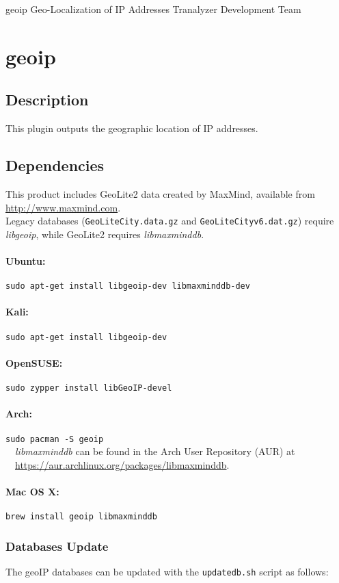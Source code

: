 \documentclass[documentation]{subfiles}
\begin{document}
\trantitle
    {geoip}
    {Geo-Localization of IP Addresses}
    {Tranalyzer Development Team}

\section{geoip}\label{s:geoip}

\subsection{Description}
This plugin outputs the geographic location of IP addresses.

\subsection{Dependencies}
This product includes GeoLite2 data created by MaxMind, available from \url{http://www.maxmind.com}.\\
Legacy databases ({\tt GeoLiteCity.data.gz} and {\tt GeoLiteCityv6.dat.gz}) require {\em libgeoip},
while GeoLite2 requires {\em libmaxminddb}.

\paragraph{Ubuntu:} {\tt sudo apt-get install libgeoip-dev libmaxminddb-dev}
\paragraph{Kali:} {\tt sudo apt-get install libgeoip-dev}
\paragraph{OpenSUSE:} {\tt sudo zypper install libGeoIP-devel}
\paragraph{Arch:} {\tt sudo pacman -S geoip}\\
\indent\indent~~{\em libmaxminddb} can be found in the Arch User Repository (AUR) at\\
\indent\indent~~\url{https://aur.archlinux.org/packages/libmaxminddb}.
\paragraph{Mac OS X:} {\tt brew install geoip libmaxminddb}\\

\subsubsection{Databases Update}
The geoIP databases can be updated with the {\tt updatedb.sh} script as follows:
\end{document}

